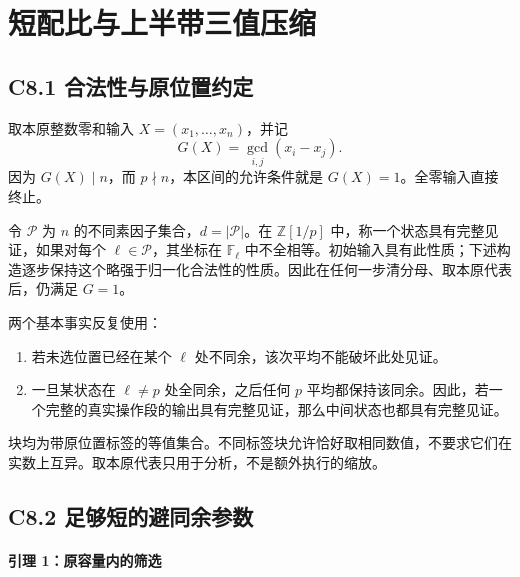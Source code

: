 \documentclass[11pt,a4paper]{article}
\newcommand{\tightlist}{\setlength{\itemsep}{0pt}\setlength{\parskip}{0pt}}
\theoremstyle{definition}
\numberwithin{equation}{section}
\begin{document}
\section{短配比与上半带三值压缩}\label{construct:short-choice}
\subsection*{\texorpdfstring{{C8.1} {合法性与原位置约定}}{C8.1 合法性与原位置约定}}\label{C8-h45}

{取本原整数零和输入} \(X=(x_1,\ldots,x_n)\){，并记} \[
G(X)=\gcd_{i,j}(x_i-x_j).
\] {因为} \(G(X)\mid n\){，而} \(p\nmid n\){，本区间的允许条件就是} \(G(X)=1\){。全零输入直接终止。}

{令} \(\mathcal P\) {为} \(n\) {的不同素因子集合，}\(d=|\mathcal P|\){。在} \(\mathbb Z[1/p]\) {中，称一个状态具有完整见证，如果对每个} \(\ell\in\mathcal P\){，其坐标在} \(\mathbb F_\ell\) {中不全相等。初始输入具有此性质；下述构造逐步保持这个略强于归一化合法性的性质。因此在任何一步清分母、取本原代表后，仍满足} \(G=1\){。}

{两个基本事实反复使用：}

\begin{enumerate}
\def\labelenumi{\arabic{enumi}.}
\tightlist
\item
  {若未选位置已经在某个} \(\ell\) {处不同余，该次平均不能破坏此处见证。}
\item
  {一旦某状态在} \(\ell\ne p\) {处全同余，之后任何} \(p\) {平均都保持该同余。因此，若一个完整的真实操作段的输出具有完整见证，那么中间状态也都具有完整见证。}
\end{enumerate}

{块均为带原位置标签的等值集合。不同标签块允许恰好取相同数值，不要求它们在实数上互异。取本原代表只用于分析，不是额外执行的缩放。}

\subsection*{\texorpdfstring{{C8.2} {足够短的避同余参数}}{C8.2 足够短的避同余参数}}\label{C8-h46}

\paragraph*{\texorpdfstring{{引理} {1：原容量内的筛选}}{引理 1：原容量内的筛选}}\label{C8-h47}
\end{document}
